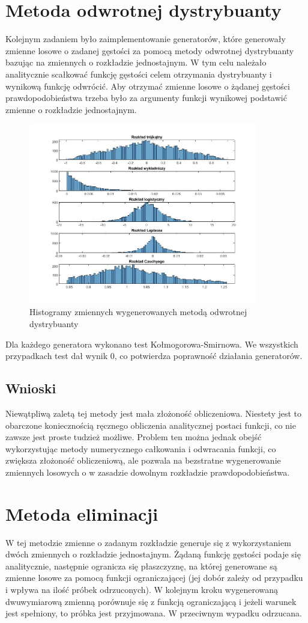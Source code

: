\documentclass[a4paper,onecolumn,oneside,12pt,extrafontsizes]{article}
\begin{document}
\section{Metoda odwrotnej dystrybuanty}
Kolejnym zadaniem było zaimplementowanie generatorów, które generowały zmienne losowe o zadanej gęstości za pomocą metody odwrotnej dystrybuanty bazując na zmiennych o rozkładzie jednostajnym. W tym celu należało analitycznie scałkować funkcję gęstości celem otrzymania dystrybuanty i wynikową funkcję odwrócić. Aby otrzymać zmienne losowe o żądanej gęstości prawdopodobieństwa trzeba było za argumenty funkcji wynikowej podstawić zmienne o rozkładzie jednostajnym.
\begin{figure}[!htb]
	\centering
	\caption{Histogramy zmiennych wygenerowanych metodą odwrotnej dystrybuanty}
	\includegraphics[width=10cm]{fig2.jpg}
\end{figure}
\newpage

Dla każdego generatora wykonano test Kołmogorowa-Smirnowa. We wszystkich przypadkach test dał wynik 0, co potwierdza poprawność działania generatorów.
\subsection{Wnioski}
Niewątpliwą zaletą tej metody jest mała złożoność obliczeniowa. Niestety jest to obarczone koniecznością ręcznego obliczenia analitycznej postaci funkcji, co nie zawsze jest proste tudzież możliwe. Problem ten można jednak obejść wykorzystując metody numerycznego całkowania i odwracania funkcji, co zwiększa złożoność obliczeniową, ale pozwala na bezstratne wygenerowanie zmiennych losowych o w zasadzie dowolnym rozkładzie prawdopodobieństwa.
\section{Metoda eliminacji}
W tej metodzie zmienne o zadanym rozkładzie generuje się z wykorzystaniem dwóch zmiennych o rozkładzie jednostajnym. Żądaną funkcję gęstości podaje się analitycznie, następnie ogranicza się płaszczyznę, na której generowane są zmienne losowe za pomocą funkcji ograniczającej (jej dobór zależy od przypadku i wpływa na ilość próbek odrzuconych). W kolejnym kroku wygenerowaną dwuwymiarową zmienną porównuje się z funkcją ograniczającą i jeżeli warunek jest spełniony, to próbka jest przyjmowana. W przeciwnym wypadku odrzucana. 
\end{document}
